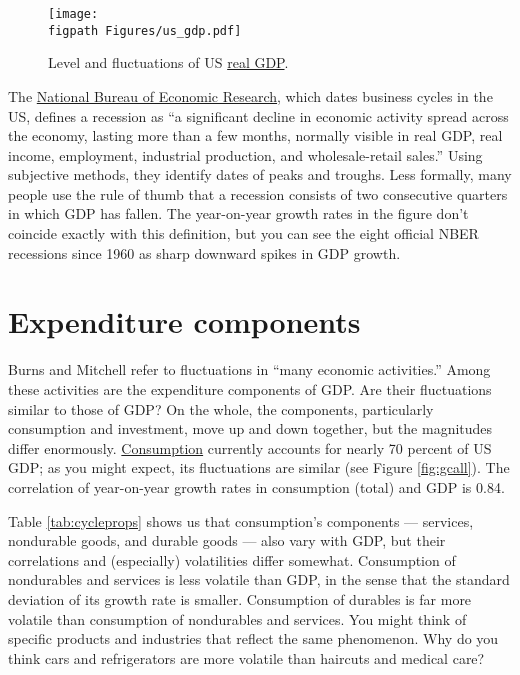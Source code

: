 \begin{figure}[ht]
 \caption{Level and fluctuations of US \href{http://research.stlouisfed.org/fred2/series/GDPC1?cid=106}{real GDP}.}
    \label{fig:yandgy}
    \centering
    \texttt{[image: \\figpath Figures/us\_gdp.pdf]}
\end{figure}

The \href{http://www.nber.org/cycles/main.html}{National Bureau of Economic Research},
which dates business cycles in the US,
defines a recession  as ``a significant decline
in economic activity spread across the economy,
lasting more than a few months, normally visible in real GDP,
real income, employment, industrial production,
and wholesale-retail sales.''
Using subjective methods, they identify dates of peaks and troughs.
Less formally, many people use the rule of thumb
that a recession consists of two consecutive quarters
in which GDP has fallen.
The year-on-year growth rates in the figure don't coincide exactly
with this definition, but you can see the eight official NBER
recessions since 1960 as sharp downward spikes in GDP growth.


\section{Expenditure components}

Burns and Mitchell refer to fluctuations in
``many economic activities.''
Among these activities are the expenditure
components of GDP.
Are their fluctuations similar to those of GDP?
On the whole, the components, particularly consumption and investment,
move up and down together, but the magnitudes differ enormously.
\href{http://research.stlouisfed.org/fred2/series/PCECC96?cid=110}{Consumption}
currently accounts for nearly 70 percent of US GDP;
as you might expect, its fluctuations are similar (see Figure \ref{fig:gcall}).
The correlation of year-on-year growth rates in consumption (total)
and GDP is 0.84.

Table \ref{tab:cycleprops} shows us that consumption's components ---
services, nondurable goods, and durable goods --- also vary with GDP,
but their correlations and (especially) volatilities differ somewhat.
Consumption of nondurables and services
is less volatile than GDP, in the sense that
the standard deviation of its growth rate is smaller.
Consumption of durables is far more
volatile %
than consumption of nondurables and services.
You might think of specific products and industries that reflect
the same phenomenon.
Why do you think cars and refrigerators
are more volatile than haircuts and medical care?

